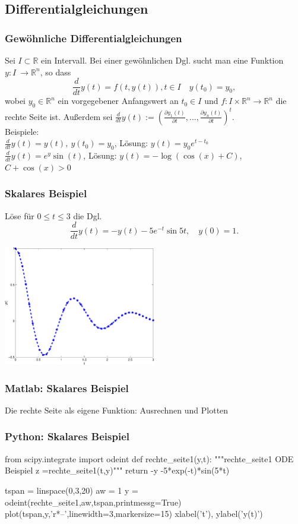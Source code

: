 \documentclass[hyperref={xetex}]{beamer}
\begin{document}
\subsection{Differentialgleichungen}
%
%
\begin{frame}[fragile]\frametitle{Gew\"ohnliche Differentialgleichungen}
Sei $I \subset \mathbb{R}$ ein Intervall. Bei einer gewöhnlichen Dgl. sucht man eine Funktion $y:I \
\longrightarrow \mathbb{R}^n$, so dass
\alert{ \[ \frac{d}{dt}y(t)=f(t,y(t)), t\in I\quad y(t_0)=y_0, \]}
wobei $y_0 \in \mathbb{R}^n$ ein vorgegebener Anfangswert an $t_0\in I$
und $f:I \times \mathbb{R}^n \longrightarrow \mathbb{R}^n$ die
rechte Seite ist. Au{\ss}erdem sei $ \frac{d}{dt}y(t) :=(\frac{\partial
  y_1(t)}{\partial t}, \dots, \frac{\partial
  y_n(t)}{\partial t})^t$. \\
\alert{Beispiele:}\\
{\scriptsize
$\frac{d}{dt} y(t) = y(t), \ y(t_0)=y_0$, \quad L\"osung:
$y(t)=y_0 e^{t-t_0}$\\
$\frac{d}{dt} y(t) = e^y \sin(t)$, \quad L\"osung: $y(t)=-\log( \cos(x)+C)$, $C+\cos(x)>0$ }
\end{frame}
%
%
\begin{frame}[fragile]\frametitle{Skalares Beispiel}
L\"ose f\"ur $0 \leq t \leq 3$ die Dgl.
\alert{ \[ \frac{d}{dt} y(t) = -y(t)-5e^{-t}\sin5t, \quad y(0)=1. \]}
\begin{center}
\includegraphics[width=0.5\textwidth]{./figures/loesung_dgl1} 
\end{center}
\end{frame}

%
%
\begin{frame}[fragile]\frametitle{Matlab: Skalares Beispiel}
Die rechte Seite als eigene Funktion:
Ausrechnen und Plotten
\end{frame}

%
%
\begin{frame}[fragile]\frametitle{Python: Skalares Beispiel}
  \begin{pyin}
from scipy.integrate import odeint
def rechte_seite1(y,t):
    """rechte_seite1   ODE Beispiel
       z  =rechte_seite1(t,y)"""
    return -y -5*exp(-t)*sin(5*t)

tspan =  linspace(0,3,20)
aw = 1
y = odeint(rechte_seite1,aw,tspan,printmessg=True)
plot(tspan,y,'r*--',linewidth=3,markersize=15)
xlabel('t'), ylabel('y(t)')    
  \end{pyin}
\end{frame}
\end{document}
